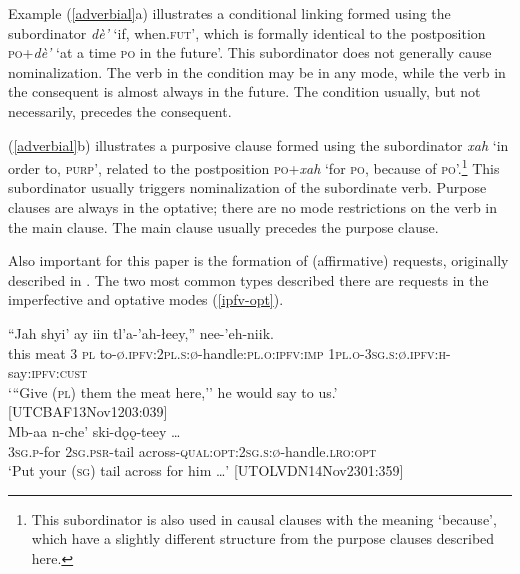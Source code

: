 \documentclass[output=paper,colorlinks,citecolor=brown
]{langscibook}
\begin{document}
Example \noindent (\ref{adverbial}a) illustrates a conditional linking formed using the subordinator \textit{dè'} `if, when.\textsc{fut}', which is formally identical to the postposition \textsc{po}+\textit{dè'} `at a time \textsc{po} in the future'. This subordinator does not generally cause nominalization. The verb in the condition may be in any mode, while the verb in the consequent is almost always in the future. The condition usually, but not necessarily, precedes the consequent.  

(\ref{adverbial}b) illustrates a purposive clause formed using the subordinator \textit{xah} `in order to, \textsc{purp}', related to the postposition \textsc{po}+\textit{xah} `for \textsc{po}, because of \textsc{po}'.\footnote{This subordinator is also used in causal clauses with the meaning `because', which have a slightly different structure from the purpose clauses described here.} This subordinator usually triggers nominalization of the subordinate verb. Purpose clauses are always in the optative; there are no mode restrictions on the verb in the main clause. The main clause usually precedes the purpose clause.

Also important for this paper is the formation of (affirmative) requests, originally described in \citet{LovickO2016}. The two most common types described there are requests in the imperfective and optative modes (\ref{ipfv-opt}). 

\begin{exe}
\ex \label{ipfv-opt}
\begin{xlista}
\ex 
\gll ``Jah shyi' ay iin tl'a-'ah-łeey,'' nee-'eh-niik. \\
this meat 3 \textsc{pl} to-\textsc{ø.ipfv:2pl.s:ø}-handle:\textsc{pl.o:ipfv:imp} \textsc{1pl.o-3sg.s:ø.ipfv:h}-say:\textsc{ipfv:cust} \\
\glt `{``}Give (\textsc{pl}) them the meat here,'' he would say to us.' \\ \hfill [UTCBAF13Nov1203:039]\\
\ex 
\gll Mb-aa n-che' ski-dǫǫ-teey \ldots\\
\textsc{3sg.p}-for \textsc{2sg.psr}-tail across-\textsc{qual:opt:2sg.s:ø}-handle.\textsc{lro:opt} \\
\glt `Put your (\textsc{sg}) tail across for him \ldots' \hfill [UTOLVDN14Nov2301:359]\\
\end{xlista}
\end{exe}
\end{document}
